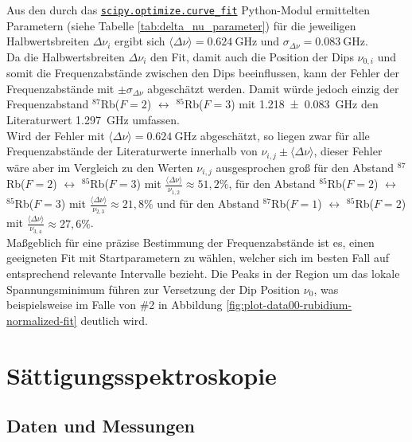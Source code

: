 \noindent Aus den durch das \href{https://docs.scipy.org/doc/scipy/reference/generated/scipy.optimize.curve_fit.html}{\texttt{scipy.optimize.curve_fit}} Python-Modul ermittelten Parametern (siehe Tabelle \ref{tab:delta_nu_parameter}) für die jeweiligen Halbwertsbreiten $\Delta \nu_{i}$  ergibt sich $\langle \Delta \nu \rangle = \SI{0,624}{\giga \hertz}$ und $\sigma_{\Delta \nu} = \SI{0.083}{\giga \hertz}$. \\
Da die Halbwertsbreiten $\Delta \nu_{i}$ den Fit, damit auch die Position der Dips $\nu_{0,i}$ und somit die Frequenzabstände zwischen den Dips beeinflussen, kann der Fehler der Frequenzabstände mit $\pm \sigma_{\Delta \nu}$ abgeschätzt werden.
Damit würde jedoch einzig der Frequenzabstand $^{87}$Rb($F = 2$) $\longleftrightarrow$ $^{85}$Rb($F = 3$) mit \SI{1,218 \pm 0,083}{\giga \hertz} den Literaturwert \SI{1,297}{\giga \hertz} umfassen. \\ 

\noindent Wird der Fehler mit $\langle \Delta \nu \rangle = \SI{0,624}{\giga \hertz}$ abgeschätzt, so liegen zwar für alle Frequenzabstände der Literaturwerte innerhalb von $\nu_{i,j} \pm \langle \Delta \nu \rangle$, dieser Fehler wäre aber im Vergleich zu den Werten $\nu_{i,j}$ ausgesprochen groß für den Abstand $^{87}$Rb($F = 2$) $\longleftrightarrow$ $^{85}$Rb($F = 3$) mit $\tfrac{\langle \Delta \nu \rangle}{\nu_{1,2}} \approx 51,2\%$, für den Abstand $^{85}$Rb($F = 2$) $\longleftrightarrow$ $^{85}$Rb($F = 3$) mit $\tfrac{\langle \Delta \nu \rangle}{\nu_{2,3}} \approx 21,8 \%$ und für den Abstand $^{87}$Rb($F = 1$) $\longleftrightarrow$ $^{85}$Rb($F = 2$) mit $\tfrac{\langle \Delta \nu \rangle}{\nu_{3,4}} \approx 27,6\%$. \\

\noindent Maßgeblich für eine präzise Bestimmung der Frequenzabstände ist es, einen geeigneten Fit mit Startparametern zu wählen, welcher sich im besten Fall auf entsprechend relevante Intervalle bezieht. Die Peaks in der Region um das lokale Spannungsminimum führen zur Versetzung der Dip Position $\nu_{0}$, was beispielsweise im Falle von \textcolor{green!50!black}{\#2} in Abbildung \ref{fig:plot-data00-rubidium-normalized-fit} deutlich wird.


\section{Sättigungsspektroskopie}

\subsection{Daten und Messungen}

